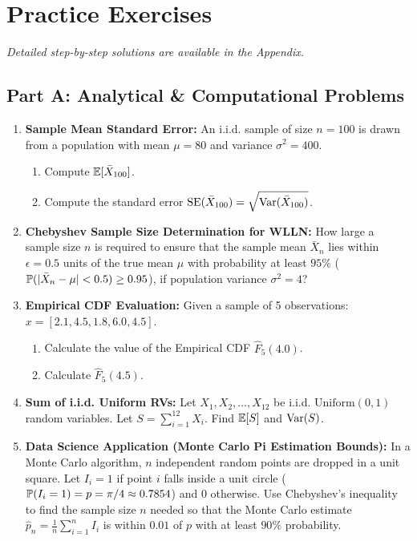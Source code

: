 \newpage
\section{Practice Exercises}
\textit{Detailed step-by-step solutions are available in the Appendix.}

\subsection*{Part A: Analytical \& Computational Problems}

\begin{enumerate}
\item \textbf{Sample Mean Standard Error:} An i.i.d. sample of size $n = 100$ is drawn from a population with mean $\mu = 80$ and variance $\sigma^2 = 400$.
    \begin{enumerate}
        \item Compute $\E[\bar{X}_{100}]$.
        \item Compute the standard error $\text{SE}(\bar{X}_{100}) = \sqrt{\Var(\bar{X}_{100})}$.
    \end{enumerate}

\item \textbf{Chebyshev Sample Size Determination for WLLN:} How large a sample size $n$ is required to ensure that the sample mean $\bar{X}_n$ lies within $\epsilon = 0.5$ units of the true mean $\mu$ with probability at least $95\%$ ($\P(|\bar{X}_n - \mu| < 0.5) \ge 0.95$), if population variance $\sigma^2 = 4$?

\item \textbf{Empirical CDF Evaluation:} Given a sample of 5 observations: $x = [2.1, 4.5, 1.8, 6.0, 4.5]$.
    \begin{enumerate}
        \item Calculate the value of the Empirical CDF $\hat{F}_5(4.0)$.
        \item Calculate $\hat{F}_5(4.5)$.
    \end{enumerate}

\item \textbf{Sum of i.i.d. Uniform RVs:} Let $X_1, X_2, \dots, X_{12}$ be i.i.d. $\text{Uniform}(0, 1)$ random variables. Let $S = \sum_{i=1}^{12} X_i$. Find $\E[S]$ and $\Var(S)$.

\item \textbf{Data Science Application (Monte Carlo Pi Estimation Bounds):} In a Monte Carlo algorithm, $n$ independent random points are dropped in a unit square. Let $I_i = 1$ if point $i$ falls inside a unit circle ($\P(I_i = 1) = p = \pi/4 \approx 0.7854$) and $0$ otherwise.
    Use Chebyshev's inequality to find the sample size $n$ needed so that the Monte Carlo estimate $\hat{p}_n = \frac{1}{n} \sum_{i=1}^n I_i$ is within $0.01$ of $p$ with at least $90\%$ probability.
\end{enumerate}


